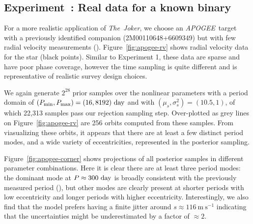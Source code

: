 \documentclass[manuscript, letterpaper]{aastex6}
\newcommand{\project}[1]{\textsl{#1}}
\newcommand{\acronym}[1]{{\small{#1}}}
\newcommand{\apogee}{\project{\acronym{APOGEE}}}
\newcommand{\samplername}{\project{The~Joker}}
\newcommand{\figname}{Figure}
\newcommand{\mps}{\mathrm{m}~\mathrm{s}^{-1}}
\newcounter{expcounter}
\begin{document}
\subsection{Experiment~: Real data for a known binary}
\label{sec:apogee}

For a more realistic application of \samplername, we choose an \apogee\ target
with a previously identified companion (2M00110648+6609349) but with few radial
velocity measurements (\citealt{Troup:2016}).
\figname~\ref{fig:apogee-rv} shows radial velocity data for the star (black
points). %
Similar to Experiment 1, these data are sparse and have poor phase coverage,
however the time sampling is quite different and is representative of realistic
survey design choices.

We again generate $2^{28}$ prior samples over the nonlinear parameters with a
period domain of $(P_{\rm min}, P_{\rm max}) = (16, 8192)~{\rm day}$ and with
$(\mu_s,\sigma^2_s) = (10.5,1)$, of which 22,313 samples pass our rejection
sampling step.
Over-plotted as grey lines on \figname~\ref{fig:apogee-rv} are 256 orbits
computed from these samples.
From viasualizing these orbits, it appears that there are at least a few
distinct period modes, and a wide variety of eccentricities, represented in the
posterior sampling.

\figname~\ref{fig:apogee-corner} shows projections of all posterior samples in
different parameter combinations.
Here it is clear there are at least three period modes: the dominant mode at $P
\approx 300~{\rm day}$ is broadly consistent with the previously measured period
(\citealt{Troup:2016}), but other modes are clearly present at shorter periods
with low eccentricity and longer periods with higher eccentricity.
Interestingly, we also find that the model prefers having a finite jitter
around $s \approx 116~\mps$ indicating that the uncertainties might be
underestimated by a factor of $\approx 2$.
\end{document}
